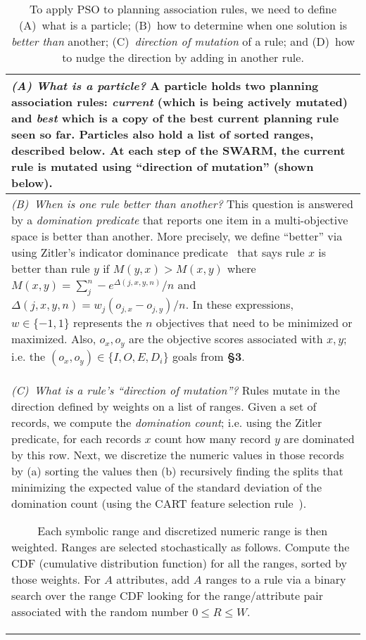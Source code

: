 \begin{table}[!t]
\caption{To apply PSO to planning association rules, we need to define (A)~what is a particle; (B)~how to determine when one solution is {\em better than} another; (C)~{\em direction of mutation} of a rule;
and (D)~how to nudge the direction by adding in another rule. }\label{tab:arch}
{ 
\begin{tabular}{|p{.99\linewidth}|}\hline

{\em (A) What is a particle?}
A particle  holds two planning association rules: {\em current} (which is being actively mutated) and  {\em best} which is a copy of the best current planning rule seen so far.
 Particles
also hold a list of sorted ranges, described below. At each step of the SWARM, the current rule is mutated using   ``direction of mutation'' (shown below).
\\\hline


{\em (B)~When is one rule better than another?}  This question is answered by a {\em domination predicate} that reports
one item in a multi-objective space is better than another. More precisely, we define ``better'' via  using Zitler's indicator
dominance predicate~\cite{zitzler2004indicator} that says rule
   $x$   is better than rule  
   $y$ if  
   $M(y,x) > M(x,y)$
   where \mbox{$M(x,y) = \sum_j^n -e^{\Delta(j,x,y,n)}/n$}
 and \mbox{$\Delta(j,x,y,n)  =  w_j(o_{j,x}  - o_{j,y})/n$}.
In these expressions,
 $w\in \{-1,1\}$   represents the $n$ objectives that need to be minimized or maximized. Also, 
 $o_x, o_y$ are the objective scores associated with $x,y$; i.e. the 
  $(o_x,o_y)\in\{I,O,E,D_i\}$ goals from {\bf \S{3}}.
\\\hline
{\em (C)~What is a rule's ``direction of mutation''?}
Rules mutate in the direction defined by weights on a list of ranges.  
Given a set of records, we  compute the {\em domination count}; i.e. using the Zitler predicate, for each records $x$ count how many record $y$ are dominated by  this row.
Next, we discretize  the numeric values in those records by   (a) sorting the values then (b) recursively finding the splits that minimizing the expected value of the standard deviation of the domination count (using the  CART feature selection rule~\cite{breiman1984classification}).

~~~~ Each   symbolic range and discretized numeric range is then weighted. Ranges are selected stochastically as follows.
Compute the CDF (cumulative distribution function) for all the ranges, sorted by those
 weights. 
 For $A$ attributes, add   $A$  ranges to a rule via  a binary search over the range CDF looking for the
 range/attribute pair associated with the   random number $0 \le R \le W$.


\end{tabular}}
\end{table}
